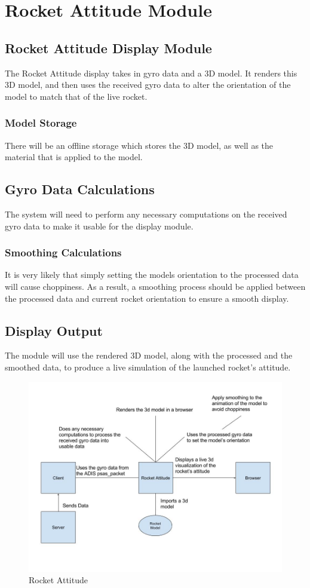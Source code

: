 \section{Rocket Attitude Module}

\subsection{Rocket Attitude Display Module}
The Rocket Attitude display takes in gyro data and a 3D model. It renders this 3D model, and then uses the received gyro data to alter the orientation of the model to match that of the live rocket.

\subsubsection{Model Storage}
There will be an offline storage which stores the 3D model, as well as the material that is applied to the model.

\subsection{Gyro Data Calculations}
The system will need to perform any necessary computations on the received gyro data to make it usable for the display module.

\subsubsection{Smoothing Calculations}
It is very likely that simply setting the models orientation to the processed data will cause choppiness. As a result, a smoothing process should be applied between the processed data and current rocket orientation to ensure a smooth display.

\subsection{Display Output}
The module will use the rendered 3D model, along with the processed and the smoothed data, to produce a live simulation of the launched rocket's attitude.

\begin{figure}[ht!]
\centering
\includegraphics[scale=.4]{imgs/attitude.jpg}
\caption{Rocket Attitude \label{overflow}}
\end{figure}
